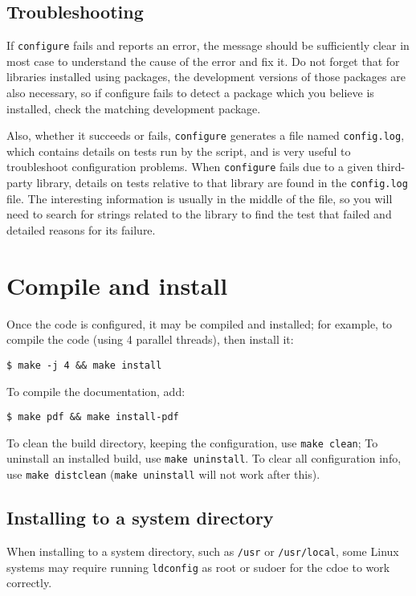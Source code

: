 \documentclass[a4paper,10pt,twoside]{csshortdoc}
\begin{document}
\subsection{Troubleshooting\label{sec:config:troubleshoot}}

If \texttt{configure} fails and reports an error, the message should
be sufficiently clear in most case to understand the cause of the
error and fix it. Do not forget that for libraries installed using
packages, the development versions of those packages are also
necessary, so if configure fails to detect a package which you
believe is installed, check the matching development package.

Also, whether it succeeds or fails, \texttt{configure} generates
a file named \texttt{config.log}, which contains details on tests
run by the script, and is very useful to troubleshoot
configuration problems. When \texttt{configure} fails due to a given
third-party library, details on tests relative to that library
are found in the \texttt{config.log} file. The interesting information
is usually in the middle of the file, so you will need to search
for strings related to the library to find the test that failed
and detailed reasons for its failure.

\section{Compile and install\label{sec:compile}}

Once the code is configured, it may be compiled and installed;
for example, to compile the code (using 4 parallel threads),
then install it:

\texttt{\$ make -j 4 \&\& make install}

To compile the documentation, add:

\texttt{\$ make pdf \&\& make install-pdf}

To clean the build directory, keeping the configuration,
use \texttt{make clean};
To uninstall an installed build, use \texttt{make uninstall}.
To clear all configuration info, use \texttt{make distclean}
(\texttt{make uninstall} will not work after this).

\subsection{Installing to a system directory\label{sec:sys_install}}

When installing to a system directory, such as \texttt{/usr}
or \texttt{/usr/local}, some Linux systems may require running
\texttt{ldconfig} as root or sudoer for the cdoe to work correctly.
\end{document}
